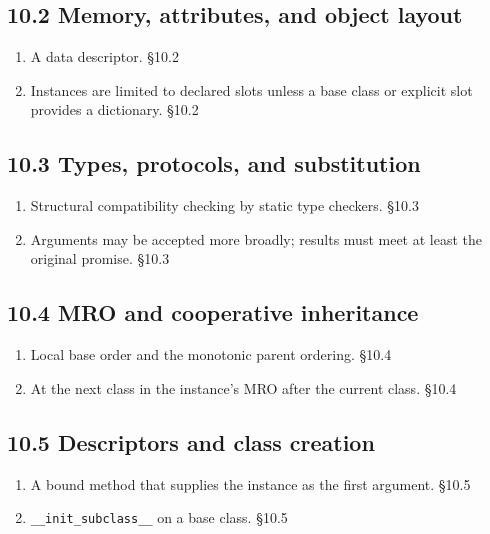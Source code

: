 \documentclass[11pt]{article}
\begin{document}
\begin{keepsection}\subsection{10.2 Memory, attributes, and object layout}

\begin{enumerate}
\item A data descriptor. \hfill{\small\color{FAUblue}§10.2}
\item Instances are limited to declared slots unless a base class or explicit slot provides a dictionary. \hfill{\small\color{FAUblue}§10.2}
\end{enumerate}

\end{keepsection}
\begin{keepsection}\subsection{10.3 Types, protocols, and substitution}

\begin{enumerate}
\item Structural compatibility checking by static type checkers. \hfill{\small\color{FAUblue}§10.3}
\item Arguments may be accepted more broadly; results must meet at least the original promise. \hfill{\small\color{FAUblue}§10.3}
\end{enumerate}

\end{keepsection}
\begin{keepsection}\subsection{10.4 MRO and cooperative inheritance}

\begin{enumerate}
\item Local base order and the monotonic parent ordering. \hfill{\small\color{FAUblue}§10.4}
\item At the next class in the instance’s MRO after the current class. \hfill{\small\color{FAUblue}§10.4}
\end{enumerate}

\end{keepsection}
\begin{keepsection}\subsection{10.5 Descriptors and class creation}

\begin{enumerate}
\item A bound method that supplies the instance as the first argument. \hfill{\small\color{FAUblue}§10.5}
\item \texttt{\_\_init\_subclass\_\_} on a base class. \hfill{\small\color{FAUblue}§10.5}
\end{enumerate}

\end{keepsection}
\end{document}

